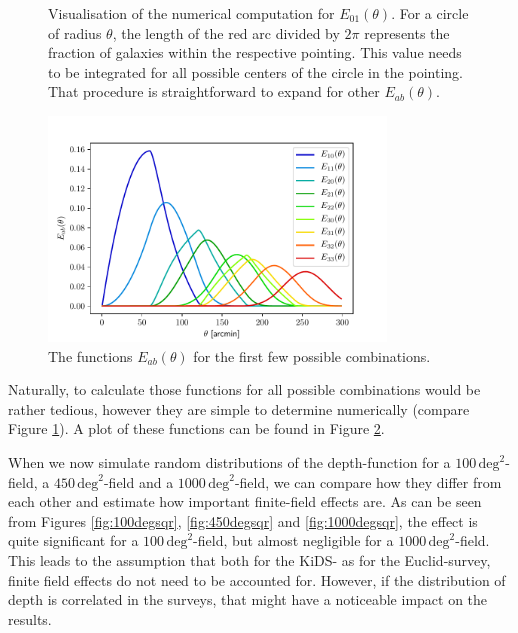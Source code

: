 \documentclass[referee]{aa} %
\renewcommand{\[}{\begin{equation}}
\renewcommand{\]}{\end{equation}}
\renewcommand{\rm}{\mathrm}
\begin{document}
\begin{appendix}
\begin{figure}
\centering
\def\svgwidth{120pt}

\caption[Visualisation of the numerical computation for $E_{01}(\theta)$.]{Visualisation of the numerical computation for $E_{01}(\theta)$. For a circle of radius $\theta$, the length of the red arc divided by $2\pi$ represents the fraction of galaxies within the respective pointing. This value needs to be integrated for all possible centers of the circle in the pointing. That procedure is straightforward to expand for other $E_{ab}(\theta)$.}
\label{fig:eoftheta_sim}
\end{figure}

\begin{figure}
\centering
\includegraphics[width = 0.8\textwidth]{images/eab.pdf}
\caption{The functions $E_{ab}(\theta)$ for the first few possible combinations.}
\label{fig:eab}
\end{figure}
Naturally, to calculate those functions for all possible combinations would be rather tedious, however they are simple to determine numerically (compare Figure \ref{fig:eoftheta_sim}). A plot of these functions can be found in Figure \ref{fig:eab}.

When we now simulate random distributions of the depth-function for a $100\,\rm{deg}^2$-field, a $450\,\rm{deg}^2$-field and a $1000\,\rm{deg}^2$-field, we can compare how they differ from each other and estimate how important finite-field effects are. As can be seen from Figures \ref{fig:100degsqr}, \ref{fig:450degsqr} and \ref{fig:1000degsqr}, the effect is quite significant for a $100\,\rm{deg}^2$-field, but almost negligible for a $1000\,\rm{deg}^2$-field. This leads to the assumption that both for the KiDS- as for the Euclid-survey, finite field effects do not need to be accounted for. However, if the distribution of depth is correlated in the surveys, that might have a noticeable impact on the results.


\end{appendix}
\end{document}
